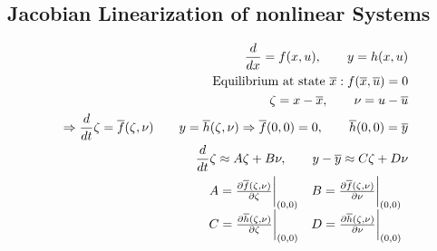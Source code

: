 \subsection*{Jacobian Linearization of nonlinear Systems}
    \begin{align*}
        \frac{d}{dx} = f(x, u), \quad \quad y = h(x, u)\\
        \text{Equilibrium at state } \overline{x}: f(\overline{x}, \overline{u}) = 0\\
        \zeta = x - \overline{x}, \quad \quad \nu = u - \overline{u}\\
        \Rightarrow \frac{d}{dt} \zeta = \overline{f}(\zeta, \nu) \quad \quad y = \overline{h}(\zeta, \nu)
        \Rightarrow \overline{f}(0, 0) = 0, \quad \quad \overline{h}(0, 0) = \overline{y}\\
        \frac{d}{dt} \zeta \approx A \zeta + B \nu, \quad \quad y - \overline{y} \approx C \zeta + D \nu\\
        \begin{array}{c c}
            A = \frac{\partial \overline{f}(\zeta, \nu)}{\partial \zeta} \bigg|_{(0, 0)}       & B = \frac{\partial \overline{f}(\zeta, \nu)}{\partial \nu} \bigg|_{(0, 0)}\\
            C = \frac{\partial \overline{h}(\zeta, \nu)}{\partial \zeta} \bigg|_{(0, 0)}       & D = \frac{\partial \overline{h}(\zeta, \nu)}{\partial \nu} \bigg|_{(0, 0)}
        \end{array}
    \end{align*}